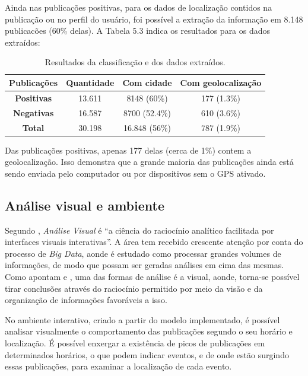 Ainda nas publicações positivas, para os dados de localização contidos na publicação ou no perfil do usuário, foi possível a extração da informação em 8.148 publicacões (60\% delas). A Tabela 5.3 indica os resultados para os dados extraídos:

\begin{table}[ht]
  \caption{Resultados da classificação e dos dados extraídos.}
  \centering
  \begin{tabular}{| c || c | c | c |}
    \hline
    \textbf{Publicações} & \textbf{Quantidade} &  \textbf{Com cidade} & \textbf{Com geolocalização} \\ [0.5ex] \hline \hline
    \textbf{Positivas} & 13.611 & 8148 (60\%) & 177 (1.3\%) \\ \hline
    \textbf{Negativas} & 16.587 & 8700 (52.4\%) & 610 (3.6\%) \\ \hline
    \textbf{Total} & 30.198 & 16.848 (56\%) & 787 (1.9\%) \\ [1ex]
    \hline
  \end{tabular}
  \label{table:nonlin}
\end{table}

Das publicações positivas, apenas 177 delas (cerca de 1\%) contem a geolocalização. Isso demonstra que a grande maioria das publicações ainda está sendo enviada pelo computador ou por dispositivos sem o GPS ativado.

\subsection{Análise visual e ambiente}

Segundo , \textit{Análise Visual} é ``a ciência do raciocínio analítico facilitada por interfaces visuais interativas''. A área tem recebido crescente atenção por conta do processo de \textit{Big Data}, aonde é estudado como processar grandes volumes de informações, de modo que possam ser geradas análises em cima das mesmas. Como apontam  e , uma das formas de análise é a visual, aonde, torna-se possível tirar conclusões através do raciocínio permitido por meio da visão e da organização de informações favoráveis a isso. 

No ambiente interativo, criado a partir do modelo implementado, é possível analisar visualmente o comportamento das publicações segundo o seu horário e localização. É possível enxergar a existência de picos de publicações em determinados horários, o que podem indicar eventos, e de onde estão surgindo essas publicações, para examinar a localização de cada evento.

